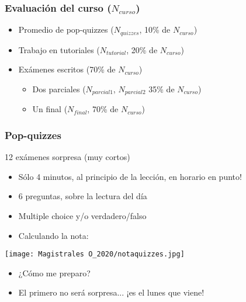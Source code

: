 \documentclass[14pt]{beamer}
\begin{document}
\begin{frame}
\frametitle{Evaluación del curso ($N_{curso}$)}
\begin{itemize}
    \item Promedio de pop-quizzes ($N_{quizzes}$, 10\% de $N_{curso}$) \vspace{2mm}
    \item Trabajo en tutoriales ($N_{tutorial}$, 20\% de $N_{curso}$) \vspace{2mm}
    \item Exámenes escritos (70\% de $N_{curso}$)
    \begin{itemize} \vspace{2mm}
        \item Dos parciales ($N_{parcial 1}$, $N_{parcial 2}$ 35\% de $N_{curso}$) \vspace{2mm}
        \item Un final ($N_{final}$, 70\% de $N_{curso}$)
    \end{itemize}    
\end{itemize}
\end{frame}

\begin{frame}
\frametitle{Pop-quizzes}
12 exámenes sorpresa (muy cortos) \vspace{2mm}
\begin{itemize}
    \item Sólo 4 minutos, al principio de la lección, en horario en punto!
    \item 6 preguntas, sobre la lectura del día
    \item Multiple choice y/o verdadero/falso
    \item Calculando la nota:
\end{itemize}
    \vspace{2mm}
\texttt{[image: Magistrales O\_2020/notaquizzes.jpg]}
\begin{itemize}
    \item ¿Cómo me preparo?
    \item El primero no será sorpresa... ¡es el lunes que viene!
\end{itemize}
\end{frame}
\end{document}
